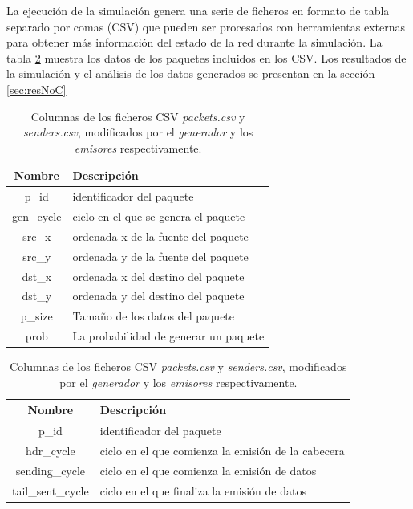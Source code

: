 La ejecución de la simulación genera una serie de ficheros en formato de tabla separado por comas (CSV) que pueden ser procesados con herramientas externas para obtener más información del estado de la red durante la simulación. La tabla \ref{tab:csv_tables} muestra los datos de los paquetes incluidos en los CSV. Los resultados de la simulación y el análisis de los datos generados se presentan en la sección \ref{sec:resNoC}

\begin{table}[ht]
    \centering
    \begin{subtable}[t]{\textwidth}
        \centering
        \begin{tabularx}{.8\textwidth}{ c | X }
            \hline
            \textbf{Nombre} & \textbf{Descripción} \\
            \hline
            p\_id & identificador del paquete \\
            gen\_cycle & ciclo en el que se genera el paquete \\
            src\_x & ordenada x de la fuente del paquete \\
            src\_y & ordenada y de la fuente del paquete \\
            dst\_x & ordenada x del destino del paquete \\
            dst\_y & ordenada y del destino del paquete \\
            p\_size & Tamaño de los datos del paquete \\
            prob & La probabilidad de generar un paquete \\
            \hline
        \end{tabularx}
        \caption{Columnas del CSV creado por el proceso \textit{generador}.}
    \end{subtable}
    \begin{subtable}[t]{\textwidth}
        \centering
        \begin{tabularx}{.8\textwidth}{c|X}
            \hline
            \textbf{Nombre} & \textbf{Descripción} \\
            \hline
            p\_id & identificador del paquete \\
            hdr\_cycle & ciclo en el que comienza la emisión de la cabecera \\
            sending\_cycle & ciclo en el que comienza la emisión de datos \\
            tail\_sent\_cycle & ciclo en el que finaliza la emisión de datos \\
            \hline
        \end{tabularx}
        \caption{Columnas del CSV escrito por los procesos \textit{emisores}.}
    \end{subtable}
    \caption{Columnas de los ficheros CSV \textit{packets.csv} y \textit{senders.csv}, modificados por el \textit{generador} y los \textit{emisores} respectivamente.}
    \label{tab:csv_tables}
\end{table}

